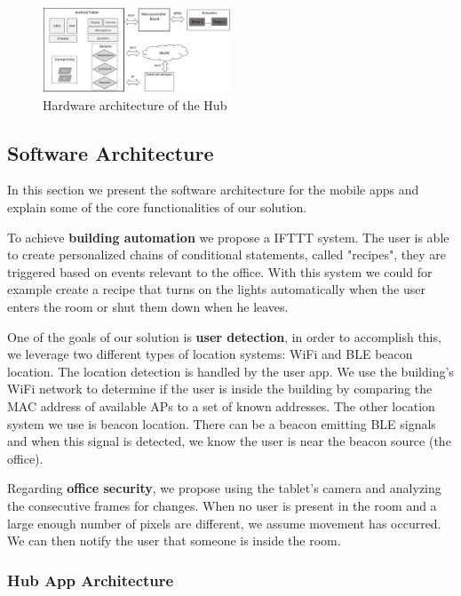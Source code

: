 \documentclass[conference]{IEEEtran}
\begin{document}
\begin{figure}[h]
\centering
\includegraphics[width=0.5\textwidth]{Figures/arch_hardware}
\caption{Hardware architecture of the Hub}
\label{hard_architecture_system}
\end{figure}


\subsection{Software Architecture}\label{architecture4} 

In this section we present the software architecture for the mobile apps and explain some of the core functionalities of our solution.

To achieve \textbf{building automation} we propose a \ac{IFTTT} system. The user is able to create personalized chains of conditional statements, called "recipes", they are triggered based on events relevant to the office. With this system we could for example create a recipe that turns on the lights automatically when the user enters the room or shut them down when he leaves.

One of the goals of our solution is \textbf{user detection}, in order to accomplish this, we leverage two different types of location systems: \ac{WiFi} and \ac{BLE} beacon location. The location detection is handled by the user app. We use the building's \ac{WiFi} network to determine if the user is inside the building by comparing the \ac{MAC} address of available \ac{AP}s to a set of known addresses. The other location system we use is beacon location. There can be a beacon emitting \ac{BLE} signals and when this signal is detected, we know the user is near the beacon source (the office).

Regarding \textbf{office security}, we propose using the tablet's camera and analyzing the consecutive frames for changes. When no user is present in the room and a large enough number of pixels are different, we assume movement has occurred. We can then notify the user that someone is inside the room.


\subsubsection{Hub App Architecture}
\end{document}
